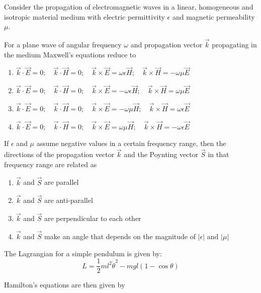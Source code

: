 \documentclass{exam}
\begin{document}
\begin{questions}
\par\noindent Consider the propagation of electromagnetic waves in a linear, homogeneous and isotropic material medium with electric permittivity $\epsilon$ and magnetic permeability $\mu$.

\question For a plane wave of angular frequency $\omega$ and propagation vector $\vec{k}$ propagating in the medium Maxwell's equations reduce to\hfill{}

\begin{enumerate}
	\item $\vec{k} \cdot \vec{E} = 0; \quad \vec{k} \cdot \vec{H} = 0; \quad \vec{k} \times \vec{E} = \omega\epsilon\vec{H}; \quad \vec{k} \times \vec{H} = -\omega\mu\vec{E}$
	\item $\vec{k} \cdot \vec{E} = 0; \quad \vec{k} \cdot \vec{H} = 0; \quad \vec{k} \times \vec{E} = -\omega\epsilon\vec{H}; \quad \vec{k} \times \vec{H} = \omega\mu\vec{E}$
	\item $\vec{k} \cdot \vec{E} = 0; \quad \vec{k} \cdot \vec{H} = 0; \quad \vec{k} \times \vec{E} = -\omega\mu\vec{H}; \quad \vec{k} \times \vec{H} = \omega\epsilon\vec{E}$
	\item $\vec{k} \cdot \vec{E} = 0; \quad \vec{k} \cdot \vec{H} = 0; \quad \vec{k} \times \vec{E} = \omega\mu\vec{H}; \quad \vec{k} \times \vec{H} = -\omega\epsilon\vec{E}$
\end{enumerate}

\question If $\epsilon$ and $\mu$ assume negative values in a certain frequency range, then the directions of the propagation vector $\vec{k}$ and the Poynting vector $\vec{S}$ in that frequency range are related as\hfill{}

\begin{enumerate}
	\item $\vec{k}$ and $\vec{S}$ are parallel \item $\vec{k}$ and $\vec{S}$ are anti-parallel
	\item $\vec{k}$ and $\vec{S}$ are perpendicular to each other
	\item $\vec{k}$ and $\vec{S}$ make an angle that depends on the magnitude of $|\epsilon|$ and $|\mu|$
\end{enumerate}

\par\noindent The Lagrangian for a simple pendulum is given by:
\[ L = \frac{1}{2}ml^2\dot{\theta}^2 - mgl(1-\cos\theta) \]

\question Hamilton's equations are then given by\hfill{}


\end{questions}
\end{document}
